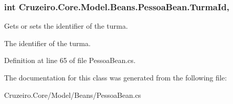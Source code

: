 \subsubsection[{\texorpdfstring{Turma\+Id}{TurmaId}}]{\setlength{\rightskip}{0pt plus 5cm}int Cruzeiro.\+Core.\+Model.\+Beans.\+Pessoa\+Bean.\+Turma\+Id\hspace{0.3cm}{\ttfamily [get]}, {\ttfamily [set]}}\hypertarget{class_cruzeiro_1_1_core_1_1_model_1_1_beans_1_1_pessoa_bean_a4003b716dc8c05f260f09c91552f1929}{}\label{class_cruzeiro_1_1_core_1_1_model_1_1_beans_1_1_pessoa_bean_a4003b716dc8c05f260f09c91552f1929}


Gets or sets the identifier of the turma. 

The identifier of the turma. 

Definition at line 65 of file Pessoa\+Bean.\+cs.



The documentation for this class was generated from the following file\+:\begin{DoxyCompactItemize}
\item 
Cruzeiro.\+Core/\+Model/\+Beans/Pessoa\+Bean.\+cs\end{DoxyCompactItemize}
